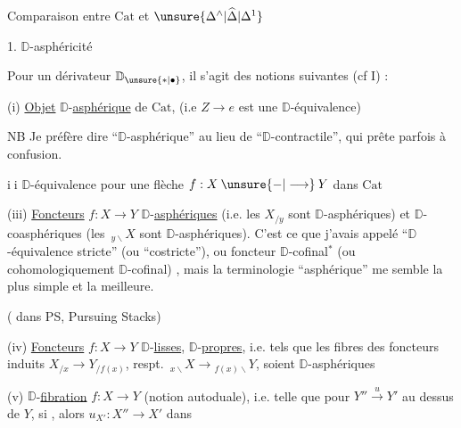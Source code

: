 
Comparaison entre $\mathrm{Cat}$ et $\unsure{\Delta^{\wedge}|\widehat{\Delta}|\Delta^{1}}$

1.   $\mathbb D$-asphéricité\unsure{,|;}  

Pour un dérivateur $\mathbb D_{\unsure{*|\bullet}}$, il s'agit des notions suivantes (cf I) :

(i) \uline{Objet} $\mathbb D$-\uline{asphérique} de $\mathrm{Cat}$, (i.e $Z\longrightarrow e$ est une $\mathbb D$-équivalence)

NB Je préfère dire ``$\mathbb D$-asphérique'' au lieu de ``$\mathbb D$-contractile'', qui prête parfois à confusion.

\textcircled{\scriptsize ii} $\mathbb D$-équivalence pour une flèche $f:X\mathbin{\unsure{-|\longrightarrow}}Y$ dans $\mathrm{Cat}$

(iii) \uline{Foncteurs} $f:X\longrightarrow Y$ $\mathbb D$-\uline{asphériques} (i.e. les $X_{/y}$ sont $\mathbb D$-asphériques) et $\mathbb D$-coasphériques (les $\,{}_{y\backslash}X$ sont $\mathbb D$-asphériques). C'est ce que j'avais appelé ``$\mathbb D$-équivalence stricte'' (ou ``costricte''), ou foncteur  $\mathbb D$-cofinal$^{*}$ (ou cohomologiquement $\mathbb D$-cofinal) , mais la terminologie ``asphérique'' me semble la plus simple et la meilleure.

( dans PS, Pursuing Stacks)

(iv) \uline{Foncteurs} $f:X\longrightarrow Y$ $\mathbb D$-\uline{lisses}, $\mathbb D$-\uline{propres}, i.e. tels que les fibres des foncteurs induits $X_{/x}\longrightarrow Y_{/f(x)}$, respt. $\,{}_{x\backslash}X\longrightarrow{}_{f(x)\backslash}Y$, soient $\mathbb D$-asphériques

(v) $\mathbb D$-\uline{fibration} $f:X\longrightarrow Y$ (notion autoduale), i.e. telle que pour $Y''\xrightarrow{u}Y'$ au dessus de $Y$, si  , alors  $u_{X'}:X''\longrightarrow X'$ dans


